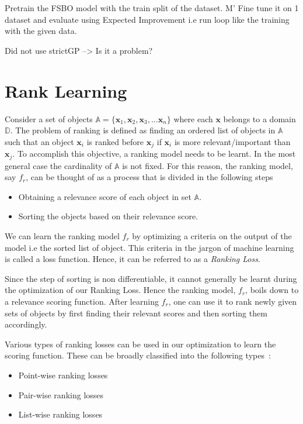 \documentclass[11pt]{report}
\begin{document}
Pretrain the FSBO model with the train split of the dataset. M'
Fine tune it on 1 dataset and evaluate using Expected Improvement
    i.e run loop like the training with the given data.

Did not use strictGP --> Is it a problem?
\fi

\section{Rank Learning}\label{sec:ranklearning}

Consider a set of objects $\mathbb{A} = \{\textbf{x}_1, \textbf{x}_2, \textbf{x}_3, ... \textbf{x}_n\}$ where each $\textbf{x}$ belongs to a domain $\mathbb{D}$.
The problem of ranking is defined as finding an ordered list of objects in $\mathbb{A}$ such that an object $\textbf{x}_i$ is ranked before $\textbf{x}_j$ if $\textbf{x}_i$  is more relevant/important than $\textbf{x}_j$.
To accomplish this objective,  a ranking model needs to be learnt.
In the most general case the cardinality of $\mathbb{A}$ is not fixed.
For this reason, the ranking model, say $f_r$, can be thought of as a process that is divided in the following steps~\cite{procedureforrankinginintro}
\begin{itemize}
\item Obtaining a relevance score of each object in set $\mathbb{A}$.
\item Sorting the objects based on their relevance score. 
\end{itemize}

We can learn the ranking model $f_r$ by optimizing a criteria on the output of the model i.e the sorted list of object.
This criteria in the jargon of machine learning is called a loss function.
Hence,  it can be referred to as a \textit{Ranking Loss}.

Since the step of sorting is non differentiable,  it cannot generally be learnt during the optimization of our Ranking Loss.
Hence the ranking model,  $f_r$,  boils down to a relevance scoring function.
After learning $f_r$,  one can use it to rank newly given sets of objects by first finding their relevant scores and then sorting them accordingly.

Various types of ranking losses can be used in our optimization to learn the scoring function.
These can be broadly classified into the following types~\cite{RankingLossFirstPaperRead}:
\begin{itemize}
\item  Point-wise ranking losses
\item  Pair-wise ranking losses
\item  List-wise ranking losses
\end{itemize}
\end{document}
